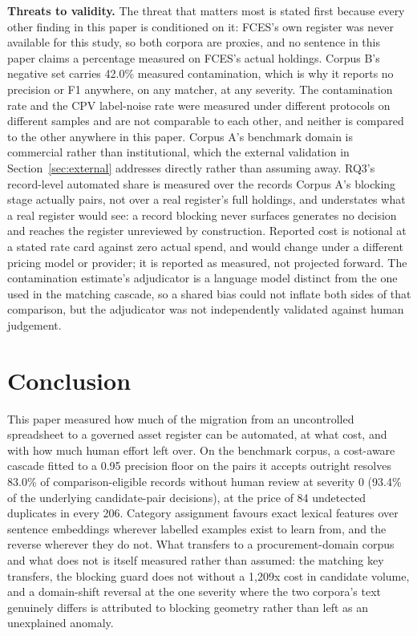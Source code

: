 \documentclass[conference]{IEEEtran}
\begin{document}
\textbf{Threats to validity.} The threat that matters most is stated
first because every other finding in this paper is conditioned on it:
FCES's own register was never available for this study, so both
corpora are proxies, and no sentence in this paper claims a percentage
measured on FCES's actual holdings. Corpus B's negative set carries
42.0\% measured contamination, which is why it reports no precision or
F1 anywhere, on any matcher, at any severity. The contamination rate
and the CPV label-noise rate were measured under different protocols on
different samples and are not comparable to each other, and neither is
compared to the other anywhere in this paper. Corpus A's benchmark
domain is commercial rather than institutional, which the external
validation in Section~\ref{sec:external} addresses directly rather than
assuming away. RQ3's record-level automated share is measured over the
records Corpus A's blocking stage actually pairs, not over a real
register's full holdings, and understates what a real register would
see: a record blocking never surfaces generates no decision and
reaches the register unreviewed by construction. Reported cost is
notional at a stated rate card against
zero actual spend, and would change under a different pricing model or
provider; it is reported as measured, not projected forward. The
contamination estimate's adjudicator is a language model distinct from
the one used in the matching cascade, so a shared bias could not
inflate both sides of that comparison, but the adjudicator was not
independently validated against human judgement.

\section{Conclusion}

This paper measured how much of the migration from an uncontrolled
spreadsheet to a governed asset register can be automated, at what
cost, and with how much human effort left over. On
the benchmark corpus, a cost-aware cascade fitted to a 0.95 precision
floor on the pairs it accepts outright resolves 83.0\% of
comparison-eligible records without human review at severity 0 (93.4\%
of the underlying candidate-pair decisions), at the price of 84
undetected duplicates in every 206. Category assignment favours exact lexical
features over sentence embeddings wherever labelled examples exist to
learn from, and the reverse wherever they do not. What transfers to a
procurement-domain corpus and what does not is itself measured rather
than assumed: the matching key transfers, the blocking guard does not
without a 1,209x cost in candidate volume, and a domain-shift reversal
at the one severity where the two corpora's text genuinely differs is
attributed to blocking geometry rather than left as an unexplained
anomaly.
\end{document}
